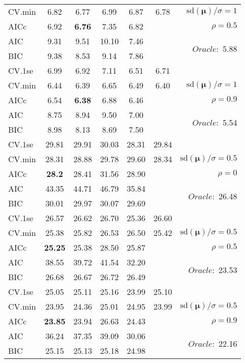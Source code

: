 \begin{table}
\begin{center}
\begin{tabular}{l*{5}{c}|r}
CV.min & 6.82 & 6.77 & 6.99 & 6.87 & 6.78 &  $\mathrm{sd}(\mathbf{\mu})/\sigma=1$ \\
AICc & 6.92 & {\bf 6.76} & 7.35 & 6.82 & & $\rho=0.5$ \\
AIC & 9.31 & 9.51 & 10.10 & 7.46 & &  \multirow{2}{*}{$Oracle: $ 5.88} \\
BIC & 9.38 & 8.53 & 9.14 & 7.86 & &  \\
 \hline 
CV.1se & 6.99 & 6.92 & 7.11 & 6.51 & 6.71 & \\
CV.min & 6.44 & 6.39 & 6.65 & 6.49 & 6.40 &  $\mathrm{sd}(\mathbf{\mu})/\sigma=1$ \\
AICc & 6.54 & {\bf 6.38} & 6.88 & 6.46 & & $\rho=0.9$ \\
AIC & 8.75 & 8.94 & 9.50 & 7.00 & &  \multirow{2}{*}{$Oracle: $ 5.54} \\
BIC & 8.98 & 8.13 & 8.69 & 7.50 & &  \\
 \hline 
CV.1se & 29.81 & 29.91 & 30.03 & 28.31 & 29.84 & \\
CV.min & 28.31 & 28.88 & 29.78 & 29.60 & 28.34 &  $\mathrm{sd}(\mathbf{\mu})/\sigma=0.5$ \\
AICc & {\bf 28.2} & 28.41 & 31.56 & 28.90 & & $\rho=0$ \\
AIC & 43.35 & 44.71 & 46.79 & 35.84 & &  \multirow{2}{*}{$Oracle: $ 26.48} \\
BIC & 30.01 & 29.97 & 30.07 & 29.69 & &  \\
 \hline 
CV.1se & 26.57 & 26.62 & 26.70 & 25.36 & 26.60 & \\
CV.min & 25.38 & 25.82 & 26.53 & 26.50 & 25.42 &  $\mathrm{sd}(\mathbf{\mu})/\sigma=0.5$ \\
AICc & {\bf 25.25} & 25.38 & 28.50 & 25.87 & & $\rho=0.5$ \\
AIC & 38.55 & 39.72 & 41.54 & 32.20 & &  \multirow{2}{*}{$Oracle: $ 23.53} \\
BIC & 26.68 & 26.67 & 26.72 & 26.49 & &  \\
 \hline 
CV.1se & 25.05 & 25.11 & 25.16 & 23.99 & 25.10 & \\
CV.min & 23.95 & 24.36 & 25.01 & 24.95 & 23.99 &  $\mathrm{sd}(\mathbf{\mu})/\sigma=0.5$ \\
AICc & {\bf 23.85} & 23.94 & 26.63 & 24.43 & & $\rho=0.9$ \\
AIC & 36.24 & 37.35 & 39.09 & 30.06 & &  \multirow{2}{*}{$Oracle: $ 22.16} \\
BIC & 25.15 & 25.13 & 25.18 & 24.98 & &  \\
 \hline 
\end{tabular}
\end{center}
\vspace{-1cm}
\end{table}





